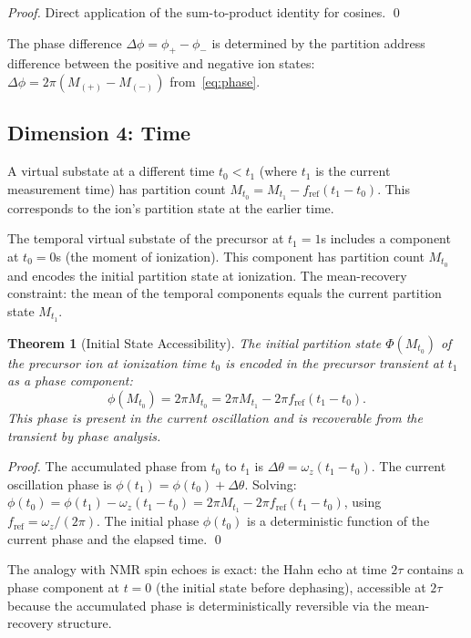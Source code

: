 \documentclass[twocolumn,10pt,a4paper]{article}
\theoremstyle{thmstyle}
\newtheorem{theorem}{Theorem}[section]
\theoremstyle{definition}
\theoremstyle{remark}
\newcommand{\PhiMap}{\varPhi}
\begin{document}
\begin{proof}
Direct application of the sum-to-product identity for cosines. \qed
\end{proof}

The phase difference $\Delta\phi = \phi_+ - \phi_-$ is determined by
the partition address difference between the positive and negative ion
states: $\Delta\phi = 2\pi(M_{(+)} - M_{(-)})$ from~\eqref{eq:phase}.

\subsection{Dimension 4: Time}

A virtual substate at a different time $t_0 < t_1$ (where $t_1$ is the
current measurement time) has partition count $M_{t_0} = M_{t_1} - f_{\text{ref}}(t_1 - t_0)$.
This corresponds to the ion's partition state at the earlier time.

The temporal virtual substate of the precursor at $t_1 = 1$s includes
a component at $t_0 = 0$s (the moment of ionization). This component
has partition count $M_{t_0}$ and encodes the initial partition state
at ionization. The mean-recovery constraint: the mean of the temporal
components equals the current partition state $M_{t_1}$.

\begin{theorem}[Initial State Accessibility]
\label{thm:initial}
The initial partition state $\PhiMap(M_{t_0})$ of the precursor ion at
ionization time $t_0$ is encoded in the precursor transient at $t_1$
as a phase component:
\begin{equation}
\phi(M_{t_0}) = 2\pi M_{t_0} = 2\pi M_{t_1} - 2\pi f_{\text{ref}}(t_1 - t_0).
\label{eq:initial-phase}
\end{equation}
This phase is present in the current oscillation and is recoverable
from the transient by phase analysis.
\end{theorem}

\begin{proof}
The accumulated phase from $t_0$ to $t_1$ is
$\Delta\theta = \omega_z(t_1 - t_0)$. The current oscillation phase is
$\phi(t_1) = \phi(t_0) + \Delta\theta$. Solving:
$\phi(t_0) = \phi(t_1) - \omega_z(t_1 - t_0) = 2\pi M_{t_1} - 2\pi f_{\text{ref}}(t_1-t_0)$,
using $f_{\text{ref}} = \omega_z/(2\pi)$. The initial phase $\phi(t_0)$
is a deterministic function of the current phase and the elapsed time. \qed
\end{proof}

The analogy with NMR spin echoes \citep{hahn1950} is exact: the Hahn
echo at time $2\tau$ contains a phase component at $t = 0$ (the initial
state before dephasing), accessible at $2\tau$ because the accumulated
phase is deterministically reversible via the mean-recovery structure.
\end{document}
